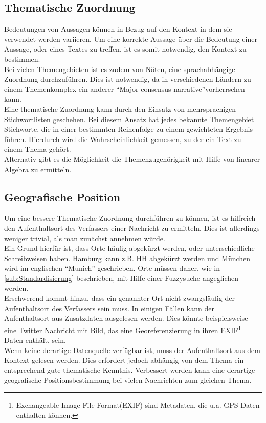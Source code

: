 \documentclass[twoside,a4paper]{article}
\begin{document}
\subsection{Thematische Zuordnung}
Bedeutungen von Aussagen können in Bezug auf den Kontext in dem sie verwendet werden variieren. Um eine korrekte Aussage über die Bedeutung einer Aussage, oder eines Textes zu treffen, ist es somit notwendig, den Kontext zu bestimmen.\\
Bei vielen Themengebieten ist es zudem von Nöten, eine sprachabhängige Zuordnung durchzuführen. Dies ist notwendig, da in verschiedenen Ländern zu einem Themenkomplex ein anderer \enquote{Major consensus narrative}\footnotemark vorherrschen kann.\\
\noindent Eine thematische Zuordnung kann durch den Einsatz von mehrsprachigen Stichwortlisten geschehen. Bei diesem Ansatz hat jedes bekannte Themengebiet Stichworte, die in einer bestimmten Reihenfolge zu einem gewichteten Ergebnis führen. Hierdurch wird die Wahrscheinlichkeit gemessen, zu der ein Text zu einem Thema gehört.\\
Alternativ gibt es die Möglichkeit die Themenzugehörigkeit mit Hilfe von linearer Algebra zu ermitteln.


\subsection{Geografische Position}
Um eine bessere Thematische Zuordnung durchführen zu können, ist es hilfreich den Aufenthaltsort des Verfassers einer Nachricht zu ermitteln. Dies ist allerdings weniger trivial, als man zunächst annehmen würde.\\
\noindent Ein Grund hierfür ist, dass Orte häufig abgekürzt werden, oder unterschiedliche Schreibweisen haben. Hamburg kann z.B. HH abgekürzt werden und München wird im englischen \enquote{Munich} geschrieben. Orte müssen daher, wie in \ref{sub:Standardisierung} beschrieben, mit Hilfe einer Fuzzysuche angeglichen werden.\\
Erschwerend kommt hinzu, dass ein genannter Ort nicht zwangsläufig der Aufenthaltsort des Verfassers sein muss. In einigen Fällen kann der Aufenthaltsort aus Zusatzdaten ausgelesen werden. Dies könnte beispielsweise eine Twitter Nachricht mit Bild, das eine Georeferenzierung in ihren EXIF\footnote{Exchangeable Image File Format(EXIF) sind Metadaten, die u.a. GPS Daten enthalten können.} Daten enthält, sein.\\
Wenn keine derartige Datenquelle verfügbar ist, muss der Aufenthaltsort aus dem Kontext gelesen werden. Dies erfordert jedoch abhängig von dem Thema ein entsprechend gute thematische Kenntnis. Verbessert werden kann eine derartige geografische Positionsbestimmung bei vielen Nachrichten zum gleichen Thema. 
\end{document}
